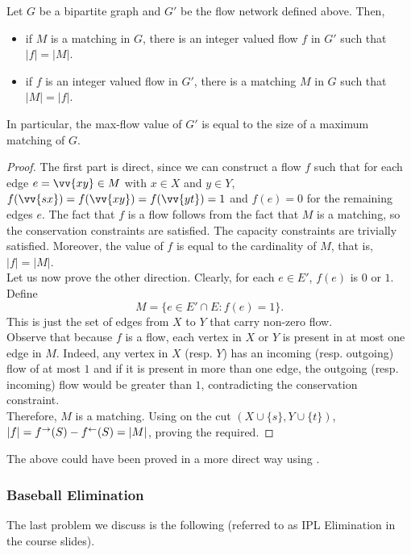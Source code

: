 		\begin{lemma}
			Let $G$ be a bipartite graph and $G'$ be the flow network defined above. Then,
			\begin{itemize}
				\item if $M$ is a matching in $G$, there is an integer valued flow $f$ in $G'$ such that $|f|=|M|$.
				\item if $f$ is an integer valued flow in $G'$, there is a matching $M$ in $G$ such that $|M|=|f|$.
			\end{itemize}
			In particular, the max-flow value of $G'$ is equal to the size of a maximum matching of $G$.
		\end{lemma}
		\begin{proof}
			The first part is direct, since we can construct a flow $f$ such that for each edge $e = \vv{xy}\in M$ with $x\in X$ and $y\in Y$, $f(\vv{sx})=f(\vv{xy})=f(\vv{yt})=1$ and $f(e)=0$ for the remaining edges $e$. The fact that $f$ is a flow follows from the fact that $M$ is a matching, so the conservation constraints are satisfied. The capacity constraints are trivially satisfied. Moreover, the value of $f$ is equal to the cardinality of $M$, that is, $|f|=|M|$.\\

			Let us now prove the other direction. Clearly, for each $e\in E'$, $f(e)$ is $0$ or $1$. Define
			\[ M = \{e\in E'\cap E : f(e)=1\}. \]
			This is just the set of edges from $X$ to $Y$ that carry non-zero flow.\\
			Observe that because $f$ is a flow, each vertex in $X$ or $Y$ is present in at most one edge in $M$. Indeed, any vertex in $X$ (resp. $Y$) has an incoming (resp. outgoing) flow of at most $1$ and if it is present in more than one edge, the outgoing (resp. incoming) flow would be greater than $1$, contradicting the conservation constraint.\\
			Therefore, $M$ is a matching. Using  on the cut $(X\cup\{s\},Y\cup\{t\})$, $|f| = f^\to(S) - f^\leftarrow(S) = |M|$, proving the required.
		\end{proof}

		The above could have been proved in a more direct way using .

	\subsubsection{Baseball Elimination}

		The last problem we discuss is the following (referred to as IPL Elimination in the course slides).\\

